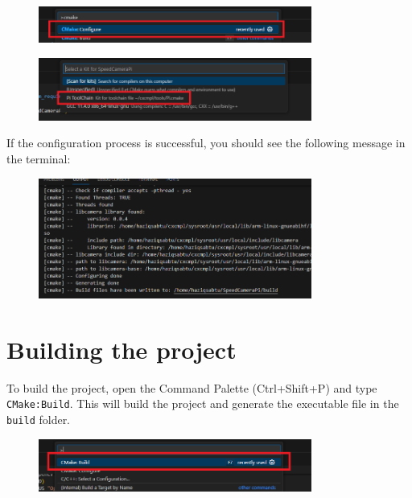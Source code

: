 \begin{figure}[H]
      \centering
      \includegraphics[width=0.8\textwidth]{texs/chapter1/image/cppconf.png}
\end{figure}

\begin{figure}[H]
      \centering
      \includegraphics[width=0.8\textwidth]{texs/chapter1/image/cppconf2.png}
\end{figure}

If the configuration process is successful, you should see the following message in the terminal:

\begin{figure}[H]
      \centering
      \includegraphics[width=0.8\textwidth]{texs/chapter1/image/cppconf3.png}
\end{figure}

\section{Building the project}

To build the project, open the Command Palette (Ctrl+Shift+P) and type \texttt{CMake:Build}. This will build the project and generate the executable file in the \texttt{build} folder.

\begin{figure}[H]
      \centering
      \includegraphics[width=0.8\textwidth]{texs/chapter1/image/cppbuild.png}
\end{figure}

